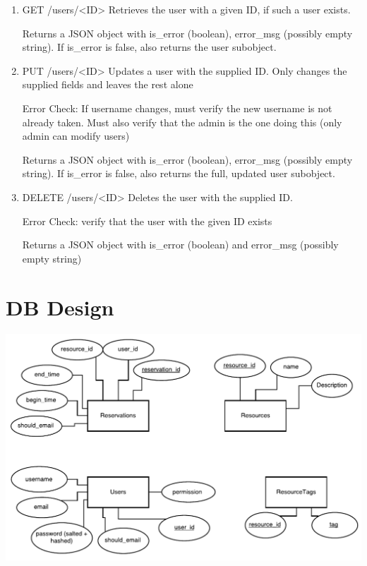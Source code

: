 \documentclass[12pt]{article}
\begin{document}
\begin{enumerate}
\item GET /users/<ID>
Retrieves the user with a given ID, if such a user exists. 

Returns a JSON object with is\_error (boolean), error\_msg (possibly empty string). If is\_error is false, also returns the user subobject. 

\item PUT /users/<ID>
Updates a user with the supplied ID. Only changes the supplied fields and leaves the rest alone

Error Check: If username changes, must verify the new username is not already taken. Must also verify that the admin is the one doing this (only admin can modify users)

Returns a JSON object with is\_error (boolean), error\_msg (possibly empty string). If is\_error is false, also returns the full, updated user subobject. 

\item DELETE /users/<ID>
Deletes the user with the supplied ID. 

Error Check: verify that the user with the given ID exists

Returns a JSON object with is\_error (boolean) and error\_msg (possibly empty string)
\end{enumerate}

\section{DB Design}
\label{appendix:DBDesign}
\includegraphics[width=6in]{Evolution1DB_cropped.pdf}
\end{document}
